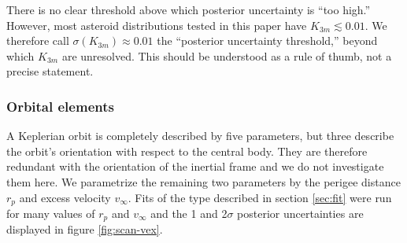 \documentclass[fleqn,usenatbib]{mnras}
\begin{document}

There is no clear threshold above which posterior uncertainty is ``too high.'' However, most asteroid distributions tested in this paper have $K_{3 m} \lesssim 0.01$. We therefore call $\sigma(K_{3 m}) \approx 0.01$ the ``posterior uncertainty threshold,'' beyond which $K_{3 m}$ are unresolved. This should be understood as a rule of thumb, not a precise statement.


\subsubsection{Orbital elements}
\label{sec:scan-orbit}
A Keplerian orbit is completely described by five parameters, but three describe the orbit's orientation with respect to the central body. They are therefore redundant with the orientation of the inertial frame and we do not investigate them here. We parametrize the remaining two parameters by the perigee distance $r_p$ and excess velocity $v_\infty$. Fits of the type described in section \ref{sec:fit} were run for many values of $r_p$ and $v_\infty$ and the 1 and 2$\sigma$ posterior uncertainties are displayed in figure \ref{fig:scan-vex}.
\end{document}
